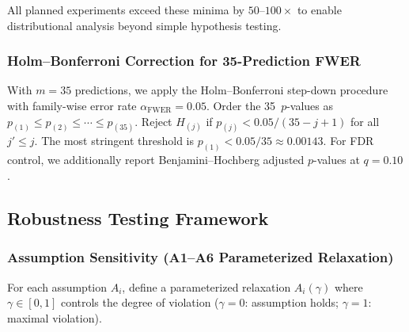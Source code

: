 \documentclass[11pt,a4paper]{article}
\theoremstyle{definition}
\begin{document}
All planned experiments exceed these minima by $50$--$100\times$ to enable
distributional analysis beyond simple hypothesis testing.

\subsubsection{Holm--Bonferroni Correction for 35-Prediction FWER}

With $m = 35$ predictions, we apply the Holm--Bonferroni step-down procedure
with family-wise error rate $\alpha_{\mathrm{FWER}} = 0.05$.
Order the 35~$p$-values as $p_{(1)} \leq p_{(2)} \leq \cdots \leq p_{(35)}$.
Reject $H_{(j)}$ if $p_{(j)} < 0.05 / (35 - j + 1)$ for all $j' \leq j$.
The most stringent threshold is $p_{(1)} < 0.05/35 \approx 0.00143$.
For FDR control, we additionally report Benjamini--Hochberg adjusted
$p$-values at $q = 0.10$.


\subsection{Robustness Testing Framework}
\label{sec:robustness}

\subsubsection{Assumption Sensitivity (A1--A6 Parameterized Relaxation)}
\label{sec:sensitivity}

For each assumption $A_i$, define a parameterized relaxation $A_i(\gamma)$
where $\gamma \in [0,1]$ controls the degree of violation ($\gamma = 0$:
assumption holds; $\gamma = 1$: maximal violation).
\end{document}
